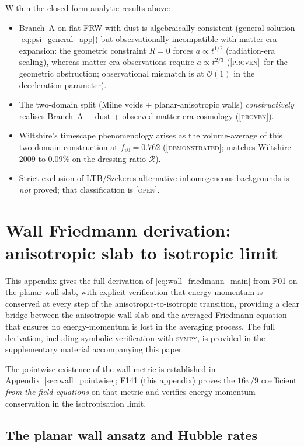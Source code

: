 \documentclass[aps,prd,twocolumn,nofootinbib,floatfix,superscriptaddress]{revtex4-2}
\newcommand{\PROVEN}{{\color{black!75!green}\textsc{[proven]}}}
\newcommand{\DEMO}{{\color{black!70!blue}\textsc{[demonstrated]}}}
\newcommand{\OPEN}{{\color{black!60!red}\textsc{[open]}}}
\begin{document}
Within the closed-form analytic results above:
\begin{itemize}
\item Branch~A on flat FRW with dust is algebraically consistent
(general solution \eqref{eq:psi_general_app}) but observationally
incompatible with matter-era expansion: the geometric constraint
$R = 0$ forces $a\propto t^{1/2}$ (radiation-era scaling), whereas
matter-era observations require $a\propto t^{2/3}$ (\PROVEN\ for
the geometric obstruction; observational mismatch is at
$\mathcal O(1)$ in the deceleration parameter).
\item The two-domain split (Milne voids + planar-anisotropic walls)
\emph{constructively} realises Branch~A + dust + observed
matter-era cosmology (\PROVEN).
\item Wiltshire's timescape phenomenology arises as the
volume-average of this two-domain construction at $f_{v0} = 0.762$
(\DEMO; matches Wiltshire 2009 to $0.09\%$ on the dressing ratio
$\mathcal{R}$).
\item Strict exclusion of LTB/Szekeres alternative inhomogeneous
backgrounds is \emph{not} proved; that classification is
\OPEN.
\end{itemize}

\section{Wall Friedmann derivation: anisotropic slab to isotropic limit}
\label{app:wall_friedmann_proof}

This appendix gives the full derivation of
\eqref{eq:wall_friedmann_main} from F01 on the planar wall slab,
with explicit verification that energy-momentum is conserved at every
step of the anisotropic-to-isotropic transition, providing a
clear bridge between the anisotropic wall slab and the averaged
Friedmann equation that ensures no energy-momentum is lost in the
averaging process. The full derivation, including symbolic
verification with \textsc{sympy}, is provided in the supplementary
material accompanying this paper.

The pointwise existence of the wall metric is established in
Appendix~\ref{sec:wall_pointwise}; F141 (this appendix) proves the
$16\pi/9$ coefficient \emph{from the field equations} on that metric
and verifies energy-momentum conservation in the isotropisation
limit.

\subsection{The planar wall ansatz and Hubble rates}
\end{document}
